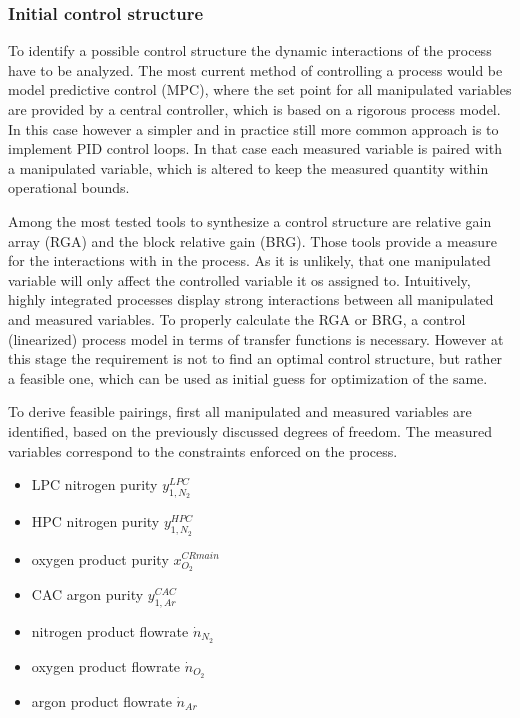         \subsubsection{Initial control structure}
        To identify a possible control structure the dynamic interactions of the process have to be analyzed.
        The most current method of controlling a process would be model predictive control (MPC), where
        the set point for all manipulated variables are provided by a central controller, which is based
        on a rigorous process model. In this case however a simpler and in practice still more common
        approach is to implement PID control loops. In that case each measured variable is paired
        with a manipulated variable, which is altered to keep the measured quantity within operational
        bounds.

        Among the most tested tools to synthesize a control structure are relative gain array (RGA) and the block
        relative gain (BRG). Those tools provide a measure for the interactions with in the process. As it
        is unlikely, that one manipulated variable will only affect the controlled variable it os assigned to.
        Intuitively, highly integrated processes display strong interactions between all manipulated and
        measured variables. To properly calculate the RGA or BRG, a control (linearized) process model
        in terms of transfer functions is necessary. However at this stage the requirement is not to find an
        optimal control structure, but rather a feasible one, which can be used as initial guess for
        optimization of the same.

        To derive feasible pairings, first all manipulated and measured variables are identified, based on the
        previously discussed degrees of freedom. The measured variables correspond to the constraints enforced on the process.
        \begin{itemize}
            \item LPC nitrogen purity $y_{1,N_2}^{LPC}$
            \item HPC nitrogen purity $y_{1,N_2}^{HPC}$
            \item oxygen product purity $x_{O_2}^{CR main}$
            \item CAC argon purity $y_{1,Ar}^{CAC}$
            \item nitrogen product flowrate $\dot{n}_{N_2}$
            \item oxygen product flowrate $\dot{n}_{O_2}$
            \item argon product flowrate $\dot{n}_{Ar}$
        \end{itemize}

